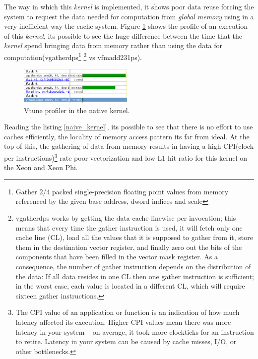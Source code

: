\par{The way in which this \emph{kernel} is implemented, it shows poor data reuse
    forcing the system to request the data needed for computation from 
    \emph{global memory} using in a very inefficient way the cache system. 
    Figure \ref{vtune_naive} shows the profile of an execution of this \emph{
    kernel}, its possible to see the huge difference between the time that the
    \emph{kernel} spend bringing data from memory rather than using the data for
    computation(vgatherdps\footnote{Gather 2/4 packed 
    single-precision floating point values from memory referenced by the given 
    base address, dword indices and scale\cite{intrinsics}}
    \footnote{vgatherdps works by getting the data cache linewise per 
    invocation; this means that every time the gather instruction 
    is used, it will fetch only one cache line (CL), load all the values that 
    it is supposed to gather from it, store them in 
    the destination vector register, and finally zero out the bits of the 
    components that have been filled in the vector mask 
    register. As a consequence, the number of gather instruction depends on 
    the distribution of the data: 
    If all data resides in one CL then one gather instruction is sufficient; 
    in the worst case, each value is located in a different CL, 
    which will require sixteen gather instructions\cite{simd}.} vs vfmadd231ps).}

\begin{figure}[!h]
    \centering
    \includegraphics[width=0.49\textwidth]{figures/vtune_naive.png}
    \caption{Vtune profiler in the native kernel.}
    \label{vtune_naive}
\end{figure}

\par{{\color{red}Reading the listing \ref{naive_kernel}, its possible to see that there is no effort to use caches efficiently, the locality of
    memory access pattern its far from ideal. At the top of this, the gathering of data from memory results in having a high CPI(clock per
    instructions)\footnote{The CPI value of an application or function is an indication of how much latency affected its execution. 
    Higher CPI values mean there was more latency in your system – on average, it took more clockticks for an instruction to retire. 
    Latency in your system can be caused by cache misses, I/O, or other bottlenecks\cite{cpi}.} 
    rate poor vectorization and low L1 hit ratio for this kernel on the Xeon and Xeon Phi.}}

